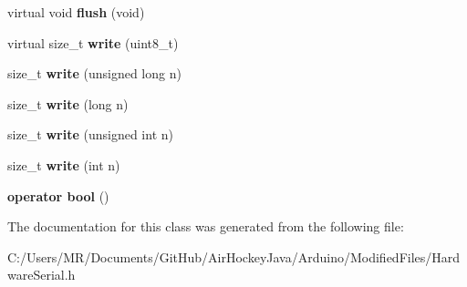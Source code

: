 \begin{DoxyCompactItemize}
\item 
\hypertarget{class_hardware_serial_a33a5d5c5ffa184e2c303a21152fa2abe}{}virtual void {\bfseries flush} (void)\label{class_hardware_serial_a33a5d5c5ffa184e2c303a21152fa2abe}

\item 
\hypertarget{class_hardware_serial_ae241985e86ddd58b967aae7e88cdf417}{}virtual size\+\_\+t {\bfseries write} (uint8\+\_\+t)\label{class_hardware_serial_ae241985e86ddd58b967aae7e88cdf417}

\item 
\hypertarget{class_hardware_serial_a16f45867c871788b2440696531f79839}{}size\+\_\+t {\bfseries write} (unsigned long n)\label{class_hardware_serial_a16f45867c871788b2440696531f79839}

\item 
\hypertarget{class_hardware_serial_ade858bfb5ab807abc646fec974c00435}{}size\+\_\+t {\bfseries write} (long n)\label{class_hardware_serial_ade858bfb5ab807abc646fec974c00435}

\item 
\hypertarget{class_hardware_serial_aefe3473ecb98923c9d7e9f9d18604727}{}size\+\_\+t {\bfseries write} (unsigned int n)\label{class_hardware_serial_aefe3473ecb98923c9d7e9f9d18604727}

\item 
\hypertarget{class_hardware_serial_a4d67d5698c572032d98ad445d3b4f897}{}size\+\_\+t {\bfseries write} (int n)\label{class_hardware_serial_a4d67d5698c572032d98ad445d3b4f897}

\item 
\hypertarget{class_hardware_serial_a3038bc051efae1dac1ad3eb39f18f7ea}{}{\bfseries operator bool} ()\label{class_hardware_serial_a3038bc051efae1dac1ad3eb39f18f7ea}

\end{DoxyCompactItemize}


The documentation for this class was generated from the following file\+:\begin{DoxyCompactItemize}
\item 
C\+:/\+Users/\+M\+R/\+Documents/\+Git\+Hub/\+Air\+Hockey\+Java/\+Arduino/\+Modified\+Files/Hardware\+Serial.\+h\end{DoxyCompactItemize}
